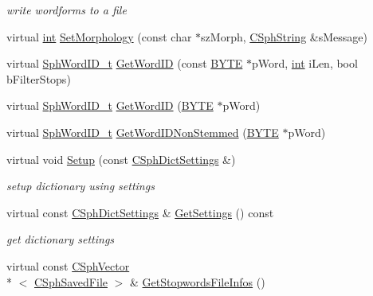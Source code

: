 \begin{DoxyCompactItemize}
\begin{DoxyCompactList}\small\item\em write wordforms to a file \end{DoxyCompactList}\item 
virtual \hyperlink{sphinxexpr_8cpp_a4a26e8f9cb8b736e0c4cbf4d16de985e}{int} \hyperlink{classCSphDictTraits_ac919c5e9a47c406b0e155c88632c9472}{Set\-Morphology} (const char $\ast$sz\-Morph, \hyperlink{structCSphString}{C\-Sph\-String} \&s\-Message)
\item 
virtual \hyperlink{sphinx_8h_a80a94d5984fdf9214a98f3e5e65df963}{Sph\-Word\-I\-D\-\_\-t} \hyperlink{classCSphDictTraits_a7aebeea18d68675a1cf0709b050f9e3c}{Get\-Word\-I\-D} (const \hyperlink{sphinxstd_8h_a4ae1dab0fb4b072a66584546209e7d58}{B\-Y\-T\-E} $\ast$p\-Word, \hyperlink{sphinxexpr_8cpp_a4a26e8f9cb8b736e0c4cbf4d16de985e}{int} i\-Len, bool b\-Filter\-Stops)
\item 
virtual \hyperlink{sphinx_8h_a80a94d5984fdf9214a98f3e5e65df963}{Sph\-Word\-I\-D\-\_\-t} \hyperlink{classCSphDictTraits_a234301b970b1fb86fa60f0fe2d1020dc}{Get\-Word\-I\-D} (\hyperlink{sphinxstd_8h_a4ae1dab0fb4b072a66584546209e7d58}{B\-Y\-T\-E} $\ast$p\-Word)
\item 
virtual \hyperlink{sphinx_8h_a80a94d5984fdf9214a98f3e5e65df963}{Sph\-Word\-I\-D\-\_\-t} \hyperlink{classCSphDictTraits_a68965b76a9bd85fe3a161ee4d904ec4e}{Get\-Word\-I\-D\-Non\-Stemmed} (\hyperlink{sphinxstd_8h_a4ae1dab0fb4b072a66584546209e7d58}{B\-Y\-T\-E} $\ast$p\-Word)
\item 
virtual void \hyperlink{classCSphDictTraits_a470fca5cd3912e42a5b7afd3f3eeb1fd}{Setup} (const \hyperlink{structCSphDictSettings}{C\-Sph\-Dict\-Settings} \&)
\begin{DoxyCompactList}\small\item\em setup dictionary using settings \end{DoxyCompactList}\item 
virtual const \hyperlink{structCSphDictSettings}{C\-Sph\-Dict\-Settings} \& \hyperlink{classCSphDictTraits_a41c4aae28b3f61066f05e26aa467c35f}{Get\-Settings} () const 
\begin{DoxyCompactList}\small\item\em get dictionary settings \end{DoxyCompactList}\item 
virtual const \hyperlink{classCSphVector}{C\-Sph\-Vector}\\*
$<$ \hyperlink{structCSphSavedFile}{C\-Sph\-Saved\-File} $>$ \& \hyperlink{classCSphDictTraits_a4e8e974d8f1a1392daa753e6831c20c5}{Get\-Stopwords\-File\-Infos} ()

\end{DoxyCompactItemize}
